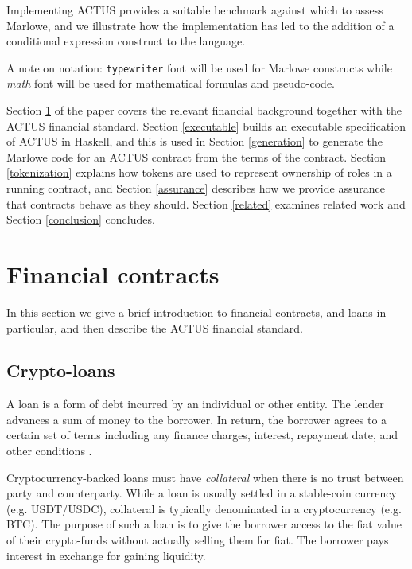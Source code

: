 \documentclass[runningheads]{llncs}
\begin{document}
Implementing ACTUS provides a suitable benchmark against which to assess Marlowe, and we illustrate how the implementation has led to the addition of a conditional expression construct to the language. 


A note on notation: \texttt{typewriter} font will be used for Marlowe constructs
while \emph{math} font will be used for mathematical formulas and pseudo-code.

Section \ref{background} of the paper covers the relevant financial background together with the ACTUS financial standard. Section \ref{executable} builds an executable specification of ACTUS in Haskell, and this is used in Section \ref{generation} to generate  the Marlowe code for an ACTUS contract from the terms of the contract. Section \ref{tokenization} explains how tokens are used to represent ownership of roles in a running contract, and Section \ref{assurance} describes how we provide assurance that  contracts behave as they should. Section \ref{related} examines related work and Section \ref{conclusion} concludes. 



\section{Financial contracts}
\label{background}

In this section we give a brief introduction to financial contracts, and loans in particular, and then describe the ACTUS financial standard.

\subsection{Crypto-loans}

A loan is a form of debt incurred by an individual or other entity.
The lender advances a sum of money to the borrower. In return, the
borrower agrees to a certain set of terms including any finance charges,
interest, repayment date, and other conditions \cite{loan}.

Cryptocurrency-backed loans must have \emph{collateral} when there is no trust
between party and counterparty. While a loan is usually settled in a
stable-coin currency (e.g. USDT/USDC), collateral is typically denominated
in a cryptocurrency (e.g. BTC). The purpose of such a loan is to give
the borrower access to the fiat value of their crypto-funds without
actually selling them for fiat. The borrower pays interest in exchange
for gaining liquidity.
\end{document}
